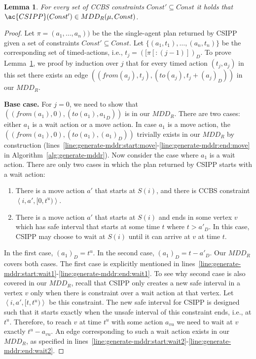 \documentclass[review]{elsarticle}
\newtheorem{lemma}{Lemma}
\newcommand{\tuple}[1]{\ensuremath{\left \langle #1 \right \rangle }}
\newcommand{\mddr}{\ensuremath{MDD_R}\xspace}
\newcommand{\fromv}{\ensuremath{\mathit{from}}\xspace}
\newcommand{\tov}{\ensuremath{\mathit{to}}\xspace}
\newcommand\konstantin[1]{\nb{\textbf{Konstantin:}}{red}{#1}}
\newcommand\roni[1]{\nb{\textbf{Roni:}}{green}{#1}}
\newcommand{\ccbs}{\ac{CCBS}\xspace}
\newcommand{\csipp}{\ac{CSIPP}\xspace}
\begin{document}
\begin{lemma}
For every set of \ccbs constraints $Const'\subseteq Const$ it holds that $\csipp(Const')\in \mddr(\mu,Const)$. 
\label{lem:mddr-ok}
\end{lemma}
\begin{proof}
Let $\pi=(a_1,\ldots,a_n))$ be the the single-agent plan returned by \csipp given a set of constraints $Const'\subseteq Const$. 
Let $\{(a_1,t_1),\ldots,(a_n,t_n)\}$ be the corresponding set of timed-actions, i.e., $t_j=([\pi[:(j-1)])_D$. 
To prove Lemma~\ref{lem:mddr-ok}, we proof by induction over $j$ that for every timed action $(t_j,a_j)$ in this set there exists an edge $((\fromv(a_j),t_j), (\tov(a_j),t_j+(a_j)_D))$ in our \mddr. 

\textbf{Base case.}
For $j=0$, we need to show that $((\fromv(a_1),0),(\tov(a_1),{a_1}_D))$ is in our \mddr. 
There are two cases: either $a_1$ is a wait action or a move action. 
In case $a_1$ is a move action, the $((\fromv(a_1),0), (\tov(a_1),(a_1)_D))$ trivially exists in our \mddr by construction (lines~\ref{line:generate-mddr:start:move}-\ref{line:generate-mddr:end:move} in Algorithm~\ref{alg:generate-mddr}). 
Now consider the case where $a_1$ is a wait action. 
There are only two cases in which the plan returned by \csipp 
starts with a wait action:
\begin{enumerate}
    \item There is a move action $a'$ that starts at $S(i)$, 
    and there is \ccbs constraint $\tuple{i,a', [0,t^u)}$. %
    \item There is a move action $a'$ that starts at $S(i)$ and ends in some vertex $v$ which has safe interval that starts at some time $t$ where $t>a'_D$. In this case, \csipp may choose to wait at $S(i)$ until it can arrive at $v$ at time $t$.
\end{enumerate}
In the first case, $(a_1)_D=t^u$. 
In the second case, $(a_1)_D=t-a'_D$. 
Our \mddr covers both cases. The first case is explicitly mentioned in lines~\ref{line:generate-mddr:start:wait1}-\ref{line:generate-mddr:end:wait1}. 
To see why second case is also covered in our \mddr, 
recall that \csipp only creates a new safe interval in a vertex $v$ only when there is constraint  over a wait action at that vertex. 
Let $\tuple{i, a',[t, t^u)}$ be this constraint. 
The new safe interval for \csipp is designed such that it starts exactly when the unsafe interval of this constraint ends, i.e., at $t^u$. 
Therefore, to reach $v$ at time $t^u$ with some action $a_{vu}$ 
we need to wait at $v$ exactly $t^u-a_{vu}$. 
An edge corresponding to such a wait action exists in our \mddr, as specified in 
lines~\ref{line:generate-mddr:start:wait2}-\ref{line:generate-mddr:end:wait2}.



\end{proof}
\end{document}

